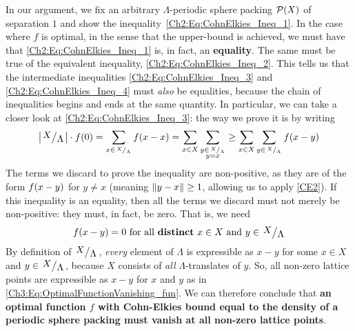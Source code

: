 In our argument, we fix an arbitrary $\Lambda$-periodic sphere packing $\mathcal{P}(X)$ of separation $1$ and show the inequality~\eqref{Ch2:Eq:CohnElkies_Ineq_1}. In the case where $f$ is optimal, in the sense that the upper-bound is achieved, we must have that \eqref{Ch2:Eq:CohnElkies_Ineq_1} is, in fact, an \textbf{equality}. The same must be true of the equivalent inequality, \eqref{Ch2:Eq:CohnElkies_Ineq_2}. This tells us that the intermediate inequalities \eqref{Ch2:Eq:CohnElkies_Ineq_3} and \eqref{Ch2:Eq:CohnElkies_Ineq_4} must \textit{also} be equalities, because the chain of inequalities begins and ends at the same quantity. In particular, we can take a closer look at \eqref{Ch2:Eq:CohnElkies_Ineq_3}: the way we prove it is by writing
\begin{align*}
    \abs{\quotient{X}{\Lambda}}  \cdot f(0)
    = \sum_{x \in {\tiny{\quotient{X}{\Lambda}}}} \fof{x - x}
    = \sum_{x \in X} \sum_{\substack{y \in {\tiny \quotient{X}{\Lambda}} \\ y = x}}
    \geq \sum_{x \in X} \sum_{y \in {\tiny \quotient{X}{\Lambda}}} \fof{x - y}
\end{align*}
The terms we discard to prove the inequality are non-positive, as they are of the form $f\!\left( x - y \right)$ for $y \neq x$ (meaning $\left\lVert y - x \right\rVert \geq 1$, allowing us to apply \ref{CE2}). If this inequality is an equality, then all the terms we discard must not merely be non-positive: they must, in fact, be zero. That is, we need
\begin{align}
    \fof{x - y} = 0 \text{ for all \textbf{distinct} } x \in X \text{ and } y \in \quotient{X}{\Lambda}
    \label{Ch3:Eq:OptimalFunctionVanishing_fun}
\end{align}
By definition of $\quotient{X}{\Lambda}$, \textit{every} element of $\Lambda$ is expressible as $x - y$ for some $x \in X$ and $y \in \quotient{X}{\Lambda}$, because $X$ consists of \textit{all} $\Lambda$-translates of $y$. So, all non-zero lattice points are expressible as $x - y$ for $x$ and $y$ as in \eqref{Ch3:Eq:OptimalFunctionVanishing_fun}. We can therefore conclude that \textbf{an optimal function $f$ with Cohn-Elkies bound equal to the density of a periodic sphere packing must vanish at all non-zero lattice points}.

